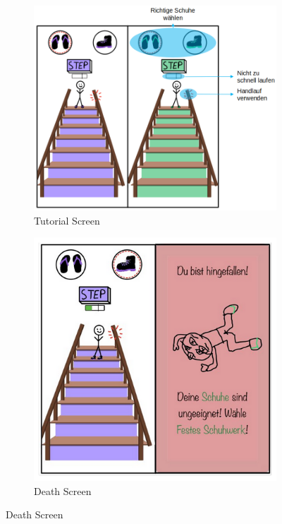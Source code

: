\documentclass{article}
\begin{document}
\begin{figure}[H]
    \centering
    \begin{subfigure}[t]{0.45\textwidth}
        \centering
        \includegraphics[width=\textwidth]{./resources/StairMaster_1.png}
        \caption{Tutorial Screen}
    \end{subfigure}
    \hfill
    \begin{subfigure}[t]{0.45\textwidth}
        \centering
        \includegraphics[width=\textwidth]{./resources/StairMaster_2.png}
        \caption{Death Screen}
    \end{subfigure}


\end{figure}
\end{document}
